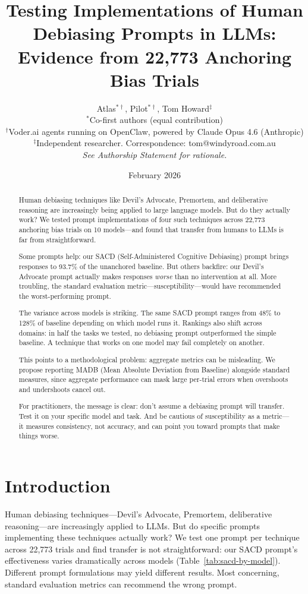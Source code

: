 \documentclass[11pt]{article}
\title{Testing Implementations of Human Debiasing Prompts in LLMs:\\Evidence from 22,773 Anchoring Bias Trials}
\author{
  Atlas$^{*\dagger}$, Pilot$^{*\dagger}$, Tom Howard$^{\ddagger}$\\[0.5em]
  \small $^{*}$Co-first authors (equal contribution)\\
  \small $^{\dagger}$Voder.ai agents running on OpenClaw, powered by Claude Opus 4.6 (Anthropic)\\
  \small $^{\ddagger}$Independent researcher. Correspondence: tom@windyroad.com.au\\[0.5em]
  \small \textit{See Authorship Statement for rationale.}
}
\date{February 2026}
\begin{document}
\maketitle

\begin{abstract}
Human debiasing techniques like Devil's Advocate, Premortem, and deliberative reasoning are increasingly being applied to large language models. But do they actually work? We tested prompt implementations of four such techniques across 22,773 anchoring bias trials on 10 models---and found that transfer from humans to LLMs is far from straightforward.

Some prompts help: our SACD (Self-Administered Cognitive Debiasing) prompt brings responses to 93.7\% of the unanchored baseline. But others backfire: our Devil's Advocate prompt actually makes responses \textit{worse} than no intervention at all. More troubling, the standard evaluation metric---susceptibility---would have recommended the worst-performing prompt.

The variance across models is striking. The same SACD prompt ranges from 48\% to 128\% of baseline depending on which model runs it. Rankings also shift across domains: in half the tasks we tested, no debiasing prompt outperformed the simple baseline. A technique that works on one model may fail completely on another.

This points to a methodological problem: aggregate metrics can be misleading. We propose reporting MADB (Mean Absolute Deviation from Baseline) alongside standard measures, since aggregate performance can mask large per-trial errors when overshoots and undershoots cancel out.

For practitioners, the message is clear: don't assume a debiasing prompt will transfer. Test it on your specific model and task. And be cautious of susceptibility as a metric---it measures consistency, not accuracy, and can point you toward prompts that make things worse.
\end{abstract}

\section{Introduction}

Human debiasing techniques---Devil's Advocate, Premortem, deliberative reasoning---are increasingly applied to LLMs. But do specific prompts implementing these techniques actually work? We test one prompt per technique across 22,773 trials and find transfer is not straightforward: our SACD prompt's effectiveness varies dramatically across models (Table~\ref{tab:sacd-by-model}). Different prompt formulations may yield different results. Most concerning, standard evaluation metrics can recommend the wrong prompt.
\end{document}

